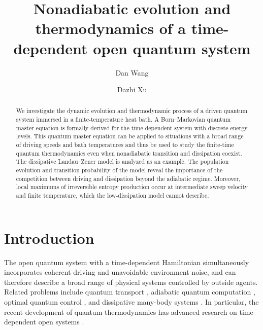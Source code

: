 \documentclass[english,nofootinbib, pra, twocolumn,superscriptaddress]{revtex4-1}
\begin{document}
\title{Nonadiabatic evolution and thermodynamics of a time-dependent open quantum
system}
\author{Dan Wang}
\author{Dazhi Xu}

\begin{abstract}
We investigate the dynamic evolution and thermodynamic process of
a driven quantum system immersed in a finite-temperature heat bath.
A Born--Markovian quantum master equation is formally derived for the time-dependent system with discrete energy levels.
This quantum master equation can be applied to situations with a broad range of driving speeds and
bath temperatures and thus be used to study the finite-time quantum thermodynamics even when nonadiabatic transition
and dissipation coexist. The dissipative Landau--Zener model is
analyzed as an example. The population evolution and transition
probability of the model reveal the importance of the competition between driving
and dissipation beyond the adiabatic regime. Moreover, local maximums
of irreversible entropy production occur at intermediate sweep
velocity and finite temperature, which the low-dissipation model cannot describe.
\end{abstract}
\maketitle

\section{Introduction}

The open quantum system with a time-dependent Hamiltonian simultaneously
incorporates coherent driving and unavoidable environment
noise, and can therefore describe a broad range of physical
systems controlled by outside agents. Related problems include
quantum transport \citep{2005.Hanggi}, adiabatic quantum computation
\citep{2002.Preskill,2008.Truncik,2010.Perez,2013.Rose}, optimal
quantum control \citep{2015.DeWeese}, and dissipative many-body systems
\citep{2011.Chen,2015.Clerk,2018.Santoro,2020.Zhai}. In particular,
the recent development of quantum thermodynamics has advanced research
on time-dependent open systems \citep{2009.Mukamel,2011.Talkner,2015.Pekola}.
\end{document}
